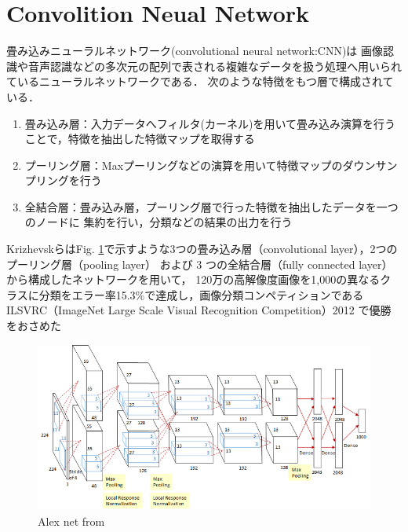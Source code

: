 \newpage
\section{Convolition Neual Network}
畳み込みニューラルネットワーク(convolutional neural network:CNN)は
画像認識や音声認識などの多次元の配列で表される複雑なデータを扱う処理へ用いられているニューラルネットワークである．
次のような特徴をもつ層で構成されている．

\begin{enumerate}
    \item 畳み込み層：入力データへフィルタ(カーネル)を用いて畳み込み演算を行うことで，特徴を抽出した特徴マップを取得する
    \item プーリング層：Maxプーリングなどの演算を用いて特徴マップのダウンサンプリングを行う
    \item 全結合層：畳み込み層，プーリング層で行った特徴を抽出したデータを一つのノードに
                      集約を行い，分類などの結果の出力を行う
\end{enumerate}


Krizhevskら\cite{Imagenet}はFig. \ref{fig::alex}で示すような3つの畳み込み層（convolutional layer），2つのプーリング層（pooling layer）
および 3 つの全結合層（fully connected layer）から構成したネットワークを用いて，
120万の高解像度画像を1,000の異なるクラスに分類をエラー率15.3\%で達成し，画像分類コンペティションであるILSVRC（ImageNet Large Scale Visual Recognition Competition）2012
で優勝をおさめた

\vspace{2.0zh}

\begin{figure}[h]
    \centering
    \includegraphics[width = 15cm]{./figs/alex.pdf}
    \caption{Alex net from \cite{Imagenet}}
    \label{fig::alex}
\end{figure}

